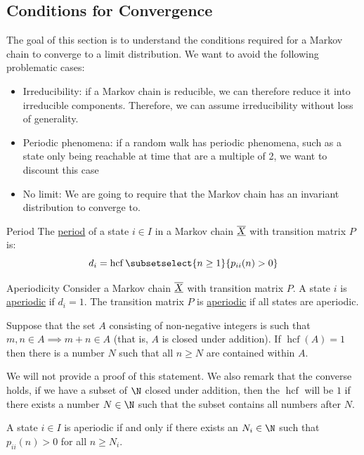 \documentclass[../Main.tex]{subfiles}
\begin{document}
\subsection{Conditions for Convergence}
The goal of this section is to understand the conditions required for a Markov chain to converge to a limit distribution. We want to avoid the following problematic cases:
\begin{itemize}
    \item Irreducibility: if a Markov chain is reducible, we can therefore reduce it into irreducible components. Therefore, we can assume irreducibility without loss of generality.
    \item Periodic phenomena: if a random walk has periodic phenomena, such as a state only being reachable at time that are a multiple of 2, we want to discount this case
    \item No limit: We are going to require that the Markov chain has an invariant distribution to converge to.
\end{itemize}
\begin{definition}{Period}
    The \underline{period} of a state $i \in I$ in a Markov chain $\underline{\overline{X}}$ with transition matrix $P$ is:
    \begin{equation*}
        d_i = \operatorname{hcf}\subsetselect{n \geq 1}{p_{ii}(n) > 0}
    \end{equation*}
\end{definition}
\begin{definition}{Aperiodicity}
    Consider a Markov chain $\underline{\overline{X}}$ with transition matrix $P$. A state $i$ is \underline{aperiodic} if $d_i = 1$. The transition matrix $P$ is \underline{aperiodic} if all states are aperiodic.
\end{definition}
\begin{lemma}
    Suppose that the set $A$ consisting of non-negative integers is such that $m, n \in A \implies m + n \in A$ (that is, $A$ is closed under addition). If $\operatorname{hcf}(A) = 1$ then there is a number $N$ such that all $n \geq N$ are contained within $A$.
    \label{lemHCFSet}
\end{lemma}
\begin{remark}
    We will not provide a proof of this statement. We also remark that the converse holds, if we have a subset of $\N$ closed under addition, then the $\operatorname{hcf}$ will be $1$ if there exists a number $N \in \N$ such that the subset contains all numbers after $N$.
\end{remark}
\begin{corollary}
    A state $i \in I$ is aperiodic if and only if there exists an $N_i \in \N$ such that $p_{ii}(n) > 0$ for all $n \geq N_i$.
    \label{corAperiodicEquiv}
\end{corollary}
\end{document}
